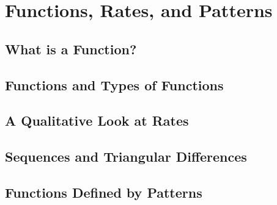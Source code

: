 \documentclass[../precalc.tex]{subfiles}
\begin{document}
\chapter{Functions, Rates, and Patterns}
\section{What is a Function?}
\section{Functions and Types of Functions}
\section{A Qualitative Look at Rates}
\section{Sequences and Triangular Differences}
\section{Functions Defined by Patterns}
\end{document}
